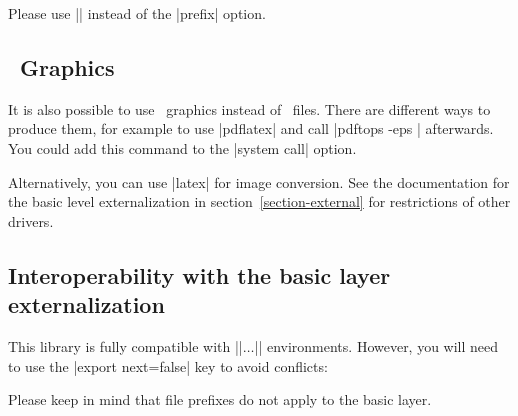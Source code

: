 Please use || instead of the |prefix| option.

\subsection{\eps\ Graphics}
It is also possible to use \eps\ graphics instead of \pdf\ files. There are different ways to produce them, for example to use |pdflatex| and call |pdftops -eps |  afterwards. You could add this command to the |system call| option.

Alternatively, you can use |latex| for image conversion. See the documentation for the basic level externalization in section~\ref{section-external} for restrictions of other drivers.

\subsection{Interoperability with the basic layer externalization}
This library is fully compatible with |\beginpgfgraphicnamed|$\dotsc$|\endpgfgraphicnamed| environments. However, you will need to use the |export next=false| key to avoid conflicts:
\begin{codeexample}
\tikzset{external/export next=false}
\endpgfgraphicnamed
\end{codeexample}
Please keep in mind that file prefixes do not apply to the basic layer.
